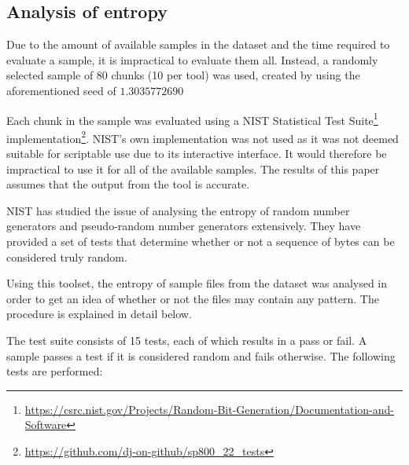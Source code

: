 \documentclass[conference]{IEEEtran}
\begin{document}
\subsection{Analysis of entropy}
\label{method:entropy}

Due to the amount of available samples in the dataset and the time required to evaluate a sample, it is impractical to evaluate them all. Instead, a randomly selected sample of 80 chunks (10 per tool) was used, created by using the aforementioned seed of $1.3035772690$

Each chunk in the sample was evaluated using a NIST Statistical Test Suite\footnote{\href{https://csrc.nist.gov/Projects/Random-Bit-Generation/Documentation-and-Software}{https://csrc.nist.gov/Projects/Random-Bit-Generation/Documentation-and-Software}} implementation\footnote{\href{https://github.com/dj-on-github/sp800_22_tests}{https://github.com/dj-on-github/sp800\_22\_tests}}. NIST's own implementation was not used as it was not deemed suitable for scriptable use due to its interactive interface. It would therefore be impractical to use it for all of the available samples. The results of this paper assumes that the output from the tool is accurate.

NIST has studied the issue of analysing the entropy of random number generators and pseudo-random number generators extensively. They have provided a set of tests that determine whether or not a sequence of bytes can be considered truly random\cite{NIST2010}.

Using this toolset, the entropy of sample files from the dataset was analysed in order to get an idea of whether or not the files may contain any pattern. The procedure is explained in detail below.

The test suite consists of 15 tests, each of which results in a pass or fail. A sample passes a test if it is considered random and fails otherwise. The following tests are performed:
\end{document}

